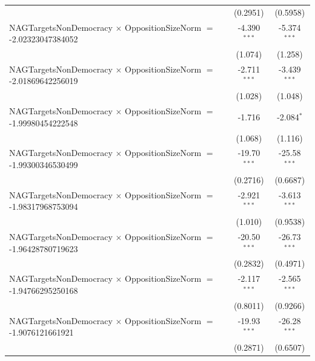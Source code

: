 \begin{tabular}{lcc}
                                                                                & (0.2951)             & (0.5958)\\   
   NAGTargetsNonDemocracy $\times$ OppositionSizeNorm $=$ -2.02323047384052     & -4.390$^{***}$       & -5.374$^{***}$\\   
                                                                                & (1.074)              & (1.258)\\   
   NAGTargetsNonDemocracy $\times$ OppositionSizeNorm $=$ -2.01869642256019     & -2.711$^{***}$       & -3.439$^{***}$\\   
                                                                                & (1.028)              & (1.048)\\   
   NAGTargetsNonDemocracy $\times$ OppositionSizeNorm $=$ -1.99980454222548     & -1.716               & -2.084$^{*}$\\   
                                                                                & (1.068)              & (1.116)\\   
   NAGTargetsNonDemocracy $\times$ OppositionSizeNorm $=$ -1.99300346530499     & -19.70$^{***}$       & -25.58$^{***}$\\   
                                                                                & (0.2716)             & (0.6687)\\   
   NAGTargetsNonDemocracy $\times$ OppositionSizeNorm $=$ -1.98317968753094     & -2.921$^{***}$       & -3.613$^{***}$\\   
                                                                                & (1.010)              & (0.9538)\\   
   NAGTargetsNonDemocracy $\times$ OppositionSizeNorm $=$ -1.96428780719623     & -20.50$^{***}$       & -26.73$^{***}$\\   
                                                                                & (0.2832)             & (0.4971)\\   
   NAGTargetsNonDemocracy $\times$ OppositionSizeNorm $=$ -1.94766295250168     & -2.117$^{***}$       & -2.565$^{***}$\\   
                                                                                & (0.8011)             & (0.9266)\\   
   NAGTargetsNonDemocracy $\times$ OppositionSizeNorm $=$ -1.9076121661921      & -19.93$^{***}$       & -26.28$^{***}$\\   
                                                                                & (0.2871)             & (0.6507)\\   

\end{tabular}
